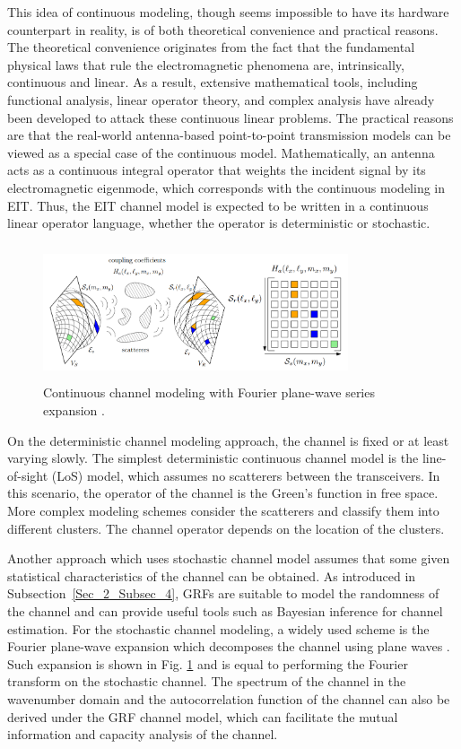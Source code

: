 \documentclass[journal,twocolumn]{IEEEtran}
\begin{document}
This idea of continuous modeling, though seems impossible to have its hardware counterpart in reality, is of both theoretical convenience and practical reasons. 
The theoretical convenience originates from the fact that the fundamental physical laws that rule the electromagnetic phenomena are, intrinsically, continuous and linear. 
As a result, extensive mathematical tools, including functional analysis, linear operator theory, and complex analysis have already been developed to attack these continuous linear problems. 
The practical reasons are that the real-world antenna-based point-to-point transmission models can be viewed as a special case of the continuous model. 
Mathematically, an antenna acts as a continuous integral operator that weights the incident signal by its electromagnetic eigenmode, which corresponds with the continuous modeling in EIT. 
Thus, the EIT channel model is expected to be written in a continuous linear operator language, whether the operator is deterministic or stochastic.
\begin{figure}
	\centering 
	\includegraphics[height=4cm, width=9cm]{figures/random_channel.png} 
	\caption{Continuous channel modeling with Fourier plane-wave series expansion \cite{9724113}.} 
	\label{fig:marzetta}
\end{figure}

On the deterministic channel modeling approach, the channel is fixed or at least varying slowly. The simplest deterministic continuous channel model is the line-of-sight (LoS) model, which assumes no scatterers between the transceivers. In this scenario, the operator of the channel is the Green's function in free space. More complex modeling schemes consider the scatterers and classify them into different clusters. The channel operator depends on the location of the clusters.

Another approach which uses stochastic channel model assumes that some given statistical characteristics of the channel can be obtained. As introduced in Subsection~\ref{Sec_2_Subsec_4}, GRFs are suitable to model the randomness of the channel and can provide useful tools such as Bayesian inference for channel estimation. For the stochastic channel modeling, a widely used scheme is the Fourier plane-wave expansion which decomposes the channel using plane waves \cite{9724113}. Such expansion is shown in Fig. \ref{fig:marzetta} and is equal to performing the Fourier transform on the stochastic channel. The spectrum of the channel in the wavenumber domain and the autocorrelation function of the channel can also be derived under the GRF channel model, which can facilitate the mutual information and capacity analysis of the channel.
\end{document}
